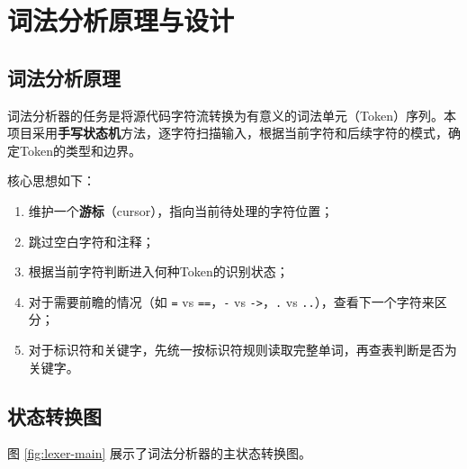 \documentclass[12pt,a4paper]{ctexart}
\begin{document}
\section{词法分析原理与设计}

\subsection{词法分析原理}

词法分析器的任务是将源代码字符流转换为有意义的词法单元（Token）序列。本项目采用\textbf{手写状态机}方法，逐字符扫描输入，根据当前字符和后续字符的模式，确定Token的类型和边界。

核心思想如下：
\begin{enumerate}
    \item 维护一个\textbf{游标}（cursor），指向当前待处理的字符位置；
    \item 跳过空白字符和注释；
    \item 根据当前字符判断进入何种Token的识别状态；
    \item 对于需要前瞻的情况（如 \texttt{=} vs \texttt{==}，\texttt{-} vs \texttt{->}，\texttt{.} vs \texttt{..}），查看下一个字符来区分；
    \item 对于标识符和关键字，先统一按标识符规则读取完整单词，再查表判断是否为关键字。
\end{enumerate}

\subsection{状态转换图}

图 \ref{fig:lexer-main} 展示了词法分析器的主状态转换图。
\end{document}
